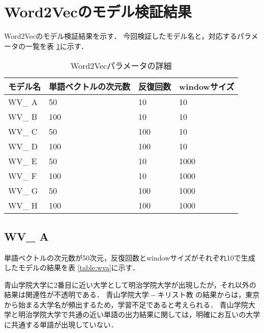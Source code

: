 \section{Word2Vecのモデル検証結果}
Word2Vecのモデル検証結果を示す．
今回検証したモデル名と，対応するパラメータの一覧を表 \ref{table:wvResultAll}に示す．

\begin{table}[H]
\caption{Word2Vecパラメータの詳細}
\centering
\begin{tabular}{llll}
\hline
モデル名 & 単語ベクトルの次元数 & 反復回数 & windowサイズ
\\ \hline \hline
WV\_ A & 50 & 10 & 10\\ \hline
WV\_ B & 100 & 10 & 10\\ \hline
WV\_ C & 50 & 100 & 10\\ \hline
WV\_ D & 100 & 100 & 10\\ \hline
WV\_ E & 50 & 10 & 1000\\ \hline
WV\_ F & 100 & 10 & 1000\\ \hline
WV\_ G & 50 & 100 & 1000\\ \hline
WV\_ H & 100 & 100 & 1000\\ \hline
\end{tabular}
\label{table:wvResultAll}
\end{table}

\subsection{WV\_ A}
単語ベクトルの次元数が50次元，反復回数とwindowサイズがそれぞれ10で生成したモデルの結果を表 \ref{table:wva}に示す．

青山学院大学に2番目に近い大学として明治学院大学が出現したが，それ以外の結果は関連性が不透明である．
$ 青山学院大学 - キリスト教 $ の結果からは，東京から始まる大学名が頻出するため，学習不足であると考えられる．
青山学院大学と明治学院大学で共通の近い単語の出力結果に関しては，明確にお互いの大学に共通する単語が出現していない．

